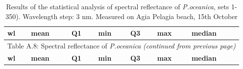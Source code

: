 \documentclass[10pt, a4paper]{article}
\begin{document}
\begin{appendices}
\begin{table}[htbp]
\end{table}
\pagebreak

\begin{longtable}{|c|c|c|c|c|c|c|}
	\caption{Results of the statistical analysis of spectral reflectance of \textit{P.oceanica}, sets 1-350). Wavelength step: 3 nm. Measured on Agia Pelagia beach, 15th October}\label{tab:A.8} \\
	  \multicolumn{1}{|l|}{\textbf{wl}} &
	   \multicolumn{1}{l|}{\textbf{mean}} & 
	   \multicolumn{1}{l|}{\textbf{Q1}} & 
	   \multicolumn{1}{l|}{\textbf{min}} & 
	   \multicolumn{1}{l|}{\textbf{Q3}} & 
	   \multicolumn{1}{l|}{\textbf{max}} & 
	   \multicolumn{1}{l|}{\textbf{median}} \\ \hline
	\endfirsthead

	\multicolumn{7}{c}{Table A.8: Spectral reflectance of \textit{P.oceanica} \textit{(continued from previous page)}}\\
	\hline \multicolumn{1}{|l|}{\textbf{wl}} & \multicolumn{1}{l|}{\textbf{mean}} & \multicolumn{1}{l|}{\textbf{Q1}} & \multicolumn{1}{l|}{\textbf{min}} & \multicolumn{1}{l|}{\textbf{Q3}} & \multicolumn{1}{l|}{\textbf{max}} & \multicolumn{1}{l|}{\textbf{median}} \\ \hline
	\endhead


\end{longtable}
\end{appendices}
\end{document}
